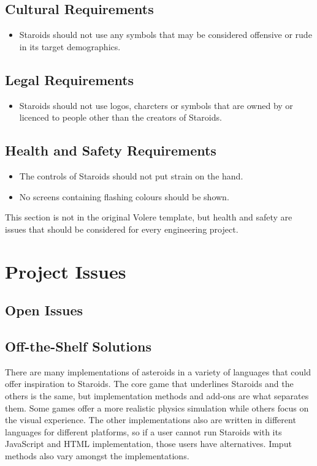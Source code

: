 \documentclass[12pt, titlepage]{article}
\begin{document}
\subsection{Cultural Requirements}
  \begin{itemize}
    \item Staroids should not use any symbols that may be considered offensive or rude in its target demographics.
  \end{itemize}

\subsection{Legal Requirements}
  \begin{itemize}
    \item Staroids should not use logos, charcters or symbols that are owned by or licenced to people other than the creators of Staroids.
  \end{itemize}

\subsection{Health and Safety Requirements}
  \begin{itemize}
    \item The controls of Staroids should not put strain on the hand.
    \item No screens containing flashing colours should be shown.
  \end{itemize}

This section is not in the original Volere template, but health and safety are
issues that should be considered for every engineering project.

\section{Project Issues}

\subsection{Open Issues}

\subsection{Off-the-Shelf Solutions}
There are many implementations of asteroids in a variety of languages that could offer inspiration to Staroids. The core game that underlines Staroids and the others is the same, but implementation methods and add-ons are what separates them. Some games offer a more realistic physics simulation while others focus on the visual experience. The other implementations also are written in different languages for different platforms, so if a user cannot run Staroids with its JavaScript and HTML implementation, those users have alternatives. Imput methods also vary amongst the implementations.\\
\end{document}
